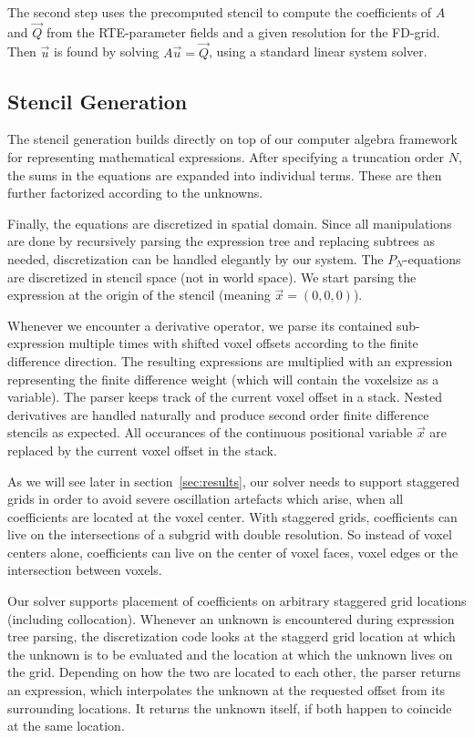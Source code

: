 The second step uses the precomputed stencil to compute the coefficients of $A$ and $\vec{Q}$ from the RTE-parameter fields and a given resolution for the FD-grid. Then $\vec{u}$ is found by solving $A\vec{u}=\vec{Q}$, using a standard linear system solver.


\subsection{Stencil Generation}

The stencil generation builds directly on top of our computer algebra framework for representing mathematical expressions. After specifying a truncation order $N$, the sums in the equations are expanded into individual terms. These are then further factorized according to the unknowns. 

Finally, the equations are discretized in spatial domain. Since all manipulations are done by recursively parsing the expression tree and replacing subtrees as needed, discretization can be handled elegantly by our system. The $P_N$-equations are discretized in stencil space (not in world space). We start parsing the expression at the origin of the stencil (meaning $\vec{x}=(0,0,0)$). 

Whenever we encounter a derivative operator, we parse its contained sub-expression multiple times with shifted voxel offsets according to the finite difference direction. The resulting expressions are multiplied with an expression representing the finite difference weight (which will contain the voxelsize as a variable). The parser keeps track of the current voxel offset in a stack. Nested derivatives are handled naturally and produce second order finite difference stencils as expected. All occurances of the continuous positional variable $\vec{x}$ are replaced by the current voxel offset in the stack. 

As we will see later in section~\ref{sec:results}, our solver needs to support staggered grids in order to avoid severe oscillation artefacts which arise, when all coefficients are located at the voxel center. With staggered grids, coefficients can live on the intersections of a subgrid with double resolution. So instead of voxel centers alone, coefficients can live on the center of voxel faces, voxel edges or the intersection between voxels.

Our solver supports placement of coefficients on arbitrary staggered grid locations (including collocation). Whenever an unknown is encountered during expression tree parsing, the discretization code looks at the staggerd grid location at which the unknown is to be evaluated and the location at which the unknown lives on the grid. Depending on how the two are located to each other, the parser returns an expression, which interpolates the unknown at the requested offset from its surrounding locations. It returns the unknown itself, if both happen to coincide at the same location.

